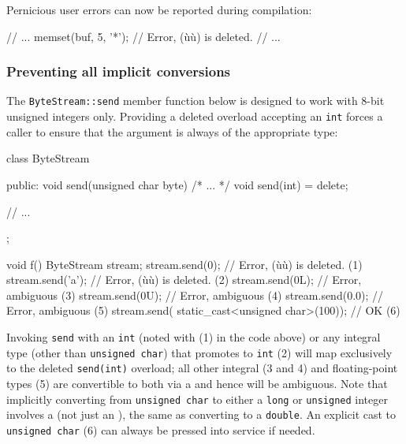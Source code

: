 \noindent Pernicious user errors can now be reported during compilation:

\begin{emcppslisting}
// ...
memset(buf, 5, '*');  // Error, (ù{}ù) is deleted.
// ...
\end{emcppslisting}


\subsubsection[Preventing all implicit conversions]{Preventing all implicit conversions}\label{preventing-all-implicit-conversions}

The \lstinline!ByteStream::send! member function below is designed to work
with 8-bit unsigned integers only. Providing a deleted overload
accepting an \lstinline!int! forces a caller to ensure that the argument is
always of the appropriate type:
\newpage%

\begin{emcppslisting}
class ByteStream
{
public:
    void send(unsigned char byte) { /* ... */ }
    void send(int) = delete;

    // ...
};

void f()
{
    ByteStream stream;
    stream.send(0);   // Error, (ù{}ù) is deleted.     (1)
    stream.send('a'); // Error, (ù{}ù) is deleted.     (2)
    stream.send(0L);  // Error, ambiguous                 (3)
    stream.send(0U);  // Error, ambiguous                 (4)
    stream.send(0.0); // Error, ambiguous                 (5)
    stream.send(
        static_cast<unsigned char>(100));  // OK          (6)
}
\end{emcppslisting}

\noindent Invoking \lstinline!send! with an \lstinline!int! (noted with (1) in the code above) or any integral type
(other than \lstinline!unsigned!~\lstinline!char!) that promotes to \lstinline!int! (2)
will map exclusively to the deleted \lstinline!send(int)! overload; all
other integral (3 and 4) and floating-point types (5) are convertible to
both via a  and hence will be ambiguous. Note that
implicitly converting from \lstinline!unsigned!~\lstinline!char! to either a
\lstinline!long! or \lstinline!unsigned! integer involves a  (not just an ), the same as
  converting to a \lstinline!double!.
An explicit cast to \lstinline!unsigned!~\lstinline!char! (6) can always be
pressed into service if needed.

